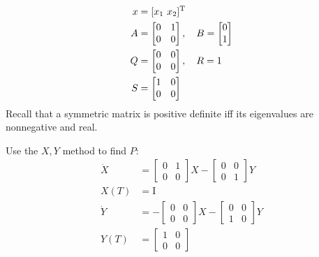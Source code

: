 \begin{align}
  x &= [x_1\ x_2]^\text{T} \\
  A &= \begin{bmatrix}
    0 & 1 \\ 0 & 0
  \end{bmatrix}, \quad B = \begin{bmatrix}
    0 \\ 1
  \end{bmatrix} \\
  Q &= \begin{bmatrix}
    0 & 0 \\ 0 & 0
  \end{bmatrix}, \quad R = 1 \\
  S &= \begin{bmatrix}
    1 & 0 \\ 0 & 0
  \end{bmatrix}
\end{align}
Recall that a symmetric matrix is positive definite iff its eigenvalues are nonnegative and real.

Use the $X,Y$ method to find $P$:
\begin{align}
  \dot X &=
           \begin{bmatrix}
             0 & 1 \\ 0 & 0
           \end{bmatrix} X - \begin{bmatrix}
             0 & 0 \\ 0 & 1
           \end{bmatrix} Y \\
  X(T) &= \mathrm{I} \\
  \dot Y &=
           - \begin{bmatrix}
             0 & 0 \\ 0 & 0
           \end{bmatrix} X - \begin{bmatrix}
             0 & 0 \\ 1 & 0
           \end{bmatrix} Y \\
  Y(T) &= \begin{bmatrix}
    1 & 0 \\ 0 & 0
  \end{bmatrix}
\end{align}

